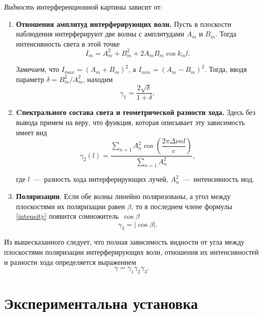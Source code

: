 \documentclass{MagicLabs}
\begin{document}
\textit{Видность }интерференционной картины  зависит от:
\begin{enumerate}
	\item \textbf{Отношения амплитуд интерферирующих волн.}
	Пусть в плоскости наблюдения интерферируют 
	две волны с амплитудами $ A_m $ и $ B_m $. Тогда интенсивность света в этой точке
	\begin{equation}\label{intensity}
	I_m = A^2_m + B^2_m + 2A_mB_m\cos{k_ml}.
	\end{equation}
	
	Замечаем, что $ I_{max} = (A_m + B_m)^2 $, а $ I_{min} = (A_m - B_m)^2 $.
	 Тогда, вводя параметр $  \delta = B_m^2/A_m^2 $, находим
	\begin{equation}\label{visibility1}
		\gamma_1 = \dfrac{2\sqrt{\delta}}{1 + \delta},
	\end{equation}	
	
	\item \textbf{Cпектрального состава света и геометрической разности хода.} 
	Здесь без вывода примем на веру, что функция,
	которая описывает эту зависимость имеет вид
	\begin{equation}\label{visibility2}
		\gamma_2(l) = \dfrac{\displaystyle \sum_{n=1}A_n^2\cos{\left(\dfrac{2\pi\Delta\nu nl}{c}\right)}}
										{\displaystyle \sum_{n=1}A_n^2},
	\end{equation}
	
	где $ l $~---~разность хода интерферирующих лучей, $ A_n^2 $~---~интенсивность мод.
	
	\item \textbf{Поляризации}. Если обе волны линейно поляризованы, а угол между 
	плоскостями их поляризации равен $ \beta $, то в последнем члене формулы 
	\eqref{intensity} появится сомножитель~$ \cos\beta $
	\begin{equation}\label{visibility3}
		\gamma_3 = |\cos\beta|.
	\end{equation}
\end{enumerate}


Из вышесказанного следует, что полная зависимость видности от угла между плоскостями поляризации интерферирующих волн, отношения их интенсивностей и разности хода определяется выражением
\begin{equation}\label{visibility}
	\gamma = \gamma_1\gamma_2\gamma_3.
\end{equation}
\newpage
\section{Экспериментальна установка}
\end{document}

